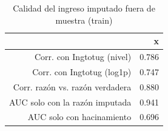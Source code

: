\begin{table}[ht]
\centering
\begin{tabular}{rr}
  \hline
 & x \\ 
  \hline
Corr. con Ingtotug (nivel) & 0.786 \\ 
  Corr. con Ingtotug (log1p) & 0.747 \\ 
  Corr. razón vs. razón verdadera & 0.880 \\ 
  AUC solo con la razón imputada & 0.941 \\ 
  AUC solo con hacinamiento & 0.696 \\ 
   \hline
\end{tabular}
\caption{Calidad del ingreso imputado fuera de muestra (train)} 
\end{table}
